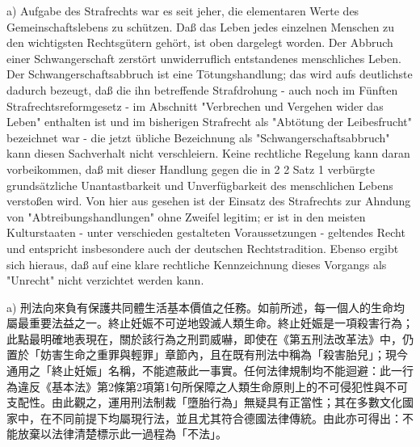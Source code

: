 \documentclass[12pt]{article}
\begin{document}
\syncleft
\begin{sourcepara}
a) Aufgabe des Strafrechts war es seit jeher, die elementaren Werte des Gemeinschaftslebens zu schützen. Daß das Leben jedes einzelnen Menschen zu den wichtigsten Rechtsgütern gehört, ist oben dargelegt worden. Der Abbruch einer Schwangerschaft zerstört unwiderruflich entstandenes menschliches Leben. Der Schwangerschaftsabbruch ist eine Tötungshandlung; das wird aufs deutlichste dadurch bezeugt, daß die ihn betreffende Strafdrohung - auch noch im Fünften Strafrechtsreformgesetz - im Abschnitt "Verbrechen und Vergehen wider das Leben" enthalten ist und im bisherigen Strafrecht als "Abtötung der Leibesfrucht" bezeichnet war - die jetzt übliche Bezeichnung als "Schwangerschaftsabbruch" kann diesen Sachverhalt nicht verschleiern. Keine rechtliche Regelung kann daran vorbeikommen, daß mit dieser Handlung gegen die in \abbrArt{} 2 \abbrAbs{} 2 Satz 1 \abbrGG{}\ggfnArtTwoTwoOneDE{} verbürgte grundsätzliche Unantastbarkeit und Unverfügbarkeit des menschlichen Lebens verstoßen wird. Von hier aus gesehen ist der Einsatz des Strafrechts zur Ahndung von "Abtreibungshandlungen" ohne Zweifel legitim; er ist in den meisten Kulturstaaten - unter verschieden gestalteten Voraussetzungen - geltendes Recht und entspricht insbesondere auch der deutschen Rechtstradition. Ebenso ergibt sich hieraus, daß auf eine klare rechtliche Kennzeichnung dieses Vorgangs als "Unrecht" nicht verzichtet werden kann.
\end{sourcepara}
\begin{transpara}
a) 刑法向來負有保護共同體生活基本價值之任務。如前所述，每一個人的生命均屬最重要法益之一。終止妊娠不可逆地毀滅人類生命。終止妊娠是一項殺害行為；此點最明確地表現在，關於該行為之刑罰威嚇，即使在《第五刑法改革法》中，仍置於「妨害生命之重罪與輕罪」章節內，且在既有刑法中稱為「殺害胎兒」；現今通用之「終止妊娠」名稱，不能遮蔽此一事實。任何法律規制均不能迴避：此一行為違反《基本法》第2條第2項第1句\ggfnArtTwoTwoOneZH{}所保障之人類生命原則上的不可侵犯性與不可支配性。由此觀之，運用刑法制裁「墮胎行為」無疑具有正當性；其在多數文化國家中，在不同前提下均屬現行法，並且尤其符合德國法律傳統。由此亦可得出：不能放棄以法律清楚標示此一過程為「不法」。
\end{transpara}
\end{document}
